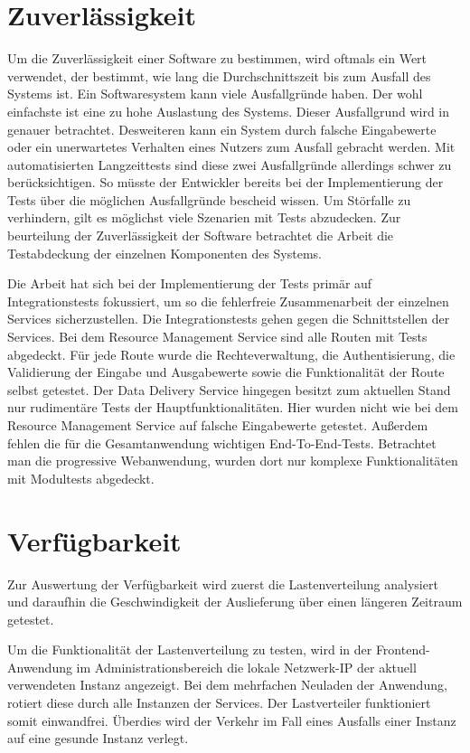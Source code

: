 \section{Zuverlässigkeit}
\label{sec:zuverlaessigkeit}
Um die Zuverlässigkeit einer Software zu bestimmen, wird oftmals ein Wert verwendet,
der bestimmt, wie lang die Durchschnittszeit bis zum Ausfall des Systems ist.\cite[S. 9]{SoftwareQualitaet}
Ein Softwaresystem kann viele Ausfallgründe haben. Der wohl einfachste ist eine zu hohe Auslastung des Systems.
Dieser Ausfallgrund wird in  genauer betrachtet. Desweiteren kann ein System durch falsche
Eingabewerte oder ein unerwartetes Verhalten eines Nutzers zum Ausfall gebracht werden. Mit automatisierten Langzeittests
sind diese zwei Ausfallgründe allerdings schwer zu berücksichtigen. So müsste der Entwickler bereits bei der Implementierung
der Tests über die möglichen Ausfallgründe bescheid wissen. Um Störfalle zu verhindern, gilt es möglichst viele Szenarien mit
Tests abzudecken. Zur beurteilung der Zuverlässigkeit der Software betrachtet die Arbeit die Testabdeckung der einzelnen Komponenten
des Systems.

Die Arbeit hat sich bei der Implementierung der Tests primär auf Integrationstests fokussiert, um so die fehlerfreie 
Zusammenarbeit der einzelnen Services sicherzustellen. Die Integrationstests gehen gegen die Schnittstellen der Services.
Bei dem Resource Management Service sind alle Routen mit Tests abgedeckt. Für jede Route wurde die Rechteverwaltung,
die Authentisierung, die Validierung der Eingabe und Ausgabewerte sowie die Funktionalität der Route selbst getestet.
Der Data Delivery Service hingegen besitzt zum aktuellen Stand nur rudimentäre Tests der Hauptfunktionalitäten.
Hier wurden nicht wie bei dem Resource Management Service auf falsche Eingabewerte getestet. Außerdem fehlen die für
die Gesamtanwendung wichtigen End-To-End-Tests. Betrachtet man die progressive Webanwendung, wurden dort nur komplexe
Funktionalitäten mit Modultests abgedeckt.

\section{Verfügbarkeit}
\label{sec:verfuegbarkeit}
Zur Auswertung der Verfügbarkeit wird zuerst die Lastenverteilung analysiert und daraufhin
die Geschwindigkeit der Auslieferung über einen längeren Zeitraum getestet.

Um die Funktionalität der Lastenverteilung zu testen, wird in der Frontend-Anwendung
im Administrationsbereich die lokale Netzwerk-IP der aktuell verwendeten Instanz
angezeigt. Bei dem mehrfachen Neuladen der Anwendung, rotiert diese
durch alle Instanzen der Services. Der Lastverteiler funktioniert somit einwandfrei.
Überdies wird der Verkehr im Fall eines Ausfalls einer Instanz auf eine gesunde
Instanz verlegt.

